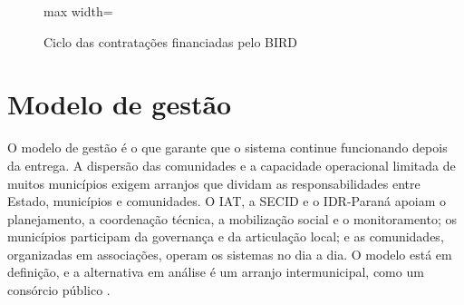 \begin{figure}[H]
  \centering
  \caption{Ciclo das contratações financiadas pelo BIRD}
  \label{fig:ciclo-contratacao}
  \begin{adjustbox}{max width=\linewidth}
  \end{adjustbox}
\end{figure}

\FloatBarrier
\section{Modelo de gestão}
\label{subsec:modelos-gestao}

O modelo de gestão é o que garante que o sistema continue funcionando depois
da entrega. A dispersão das comunidades e a capacidade operacional limitada de
muitos municípios exigem arranjos que dividam as responsabilidades entre
Estado, municípios e comunidades. O IAT, a SECID e o IDR-Paraná apoiam o
planejamento, a coordenação técnica, a mobilização social e o monitoramento;
os municípios participam da governança e da articulação local; e as
comunidades, organizadas em associações, operam os sistemas no dia a dia. O
modelo está em definição, e a alternativa em análise é um arranjo
intermunicipal, como um consórcio público \cite{mop2026}.

